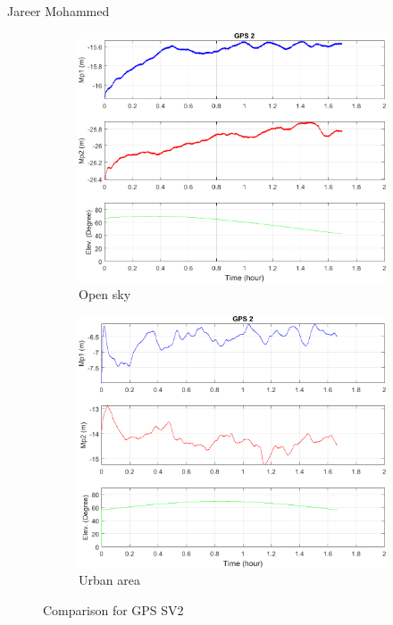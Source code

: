\documentclass[11pt]{beamer}
\begin{document}
\begin{frame}{Jareer Mohammed}%

	\begin{figure}
		\centering
		\begin{subfigure}{.5\textwidth}
			\centering
			\includegraphics[width=\textwidth]{pic/2_GS10_test_option_12.png}
			\caption{Open sky}
		\end{subfigure}%
		\begin{subfigure}{.5\textwidth}
			\centering
			\includegraphics[width=\textwidth]{pic/2_GS09_test_option_12.png}
			\caption{Urban area}
		\end{subfigure}
		\caption{Comparison for GPS SV2}
	\end{figure}
\end{frame}
\end{document}
